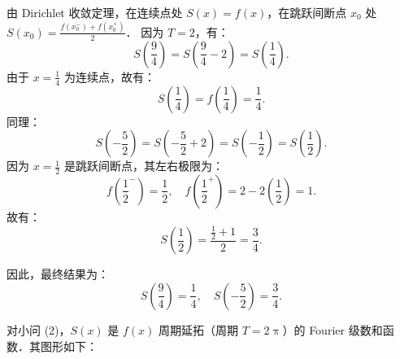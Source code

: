 \begin{solution}
    由 Dirichlet 收敛定理，在连续点处 $S(x) = f(x)$，在跳跃间断点 $x_0$ 处 $S(x_0) = \frac{f(x_0^-) + f(x_0^+)}{2}$．
    因为 $T = 2$，有：
    \begin{equation}
        S\left(\frac{9}{4}\right) = S\left(\frac{9}{4} - 2\right) = S\left(\frac{1}{4}\right).
    \end{equation}
    由于 $x = \frac{1}{4}$ 为连续点，故有：
    \begin{equation}
        S\left(\frac{1}{4}\right) = f\left(\frac{1}{4}\right) = \frac{1}{4}.
    \end{equation}
    同理：
    \begin{equation}
        S\left(-\frac{5}{2}\right) = S\left(-\frac{5}{2} + 2\right) = S\left(-\frac{1}{2}\right) = S\left(\frac{1}{2}\right).
    \end{equation}
    因为 $x = \frac{1}{2}$ 是跳跃间断点，其左右极限为：
    \begin{equation}
        f\left(\frac{1}{2}^-\right) = \frac{1}{2}, \quad f\left(\frac{1}{2}^+\right) = 2 - 2\left(\frac{1}{2}\right) = 1.
    \end{equation}
    故有：
    \begin{equation}
        S\left(\frac{1}{2}\right) = \frac{\frac{1}{2} + 1}{2} = \frac{3}{4}.
    \end{equation}

    因此，最终结果为：
    \begin{equation}
        \boxed{S\left(\frac{9}{4}\right) = \frac{1}{4}, \quad S\left(-\frac{5}{2}\right) = \frac{3}{4}}.
    \end{equation}


    对小问 (2)，$S(x)$ 是 $f(x)$ 周期延拓（周期 $T = 2\uppi$）的 Fourier 级数和函数．其图形如下：
    \begin{center}
\end{center}
\end{solution}
